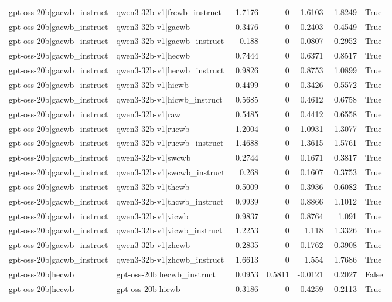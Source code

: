 \begin{table}
\begin{tabular}{l l r r r r l}
gpt-oss-20b|gacwb_instruct & qwen3-32b-v1|frcwb_instruct & 1.7176 & 0 & 1.6103 & 1.8249 & True \\
gpt-oss-20b|gacwb_instruct & qwen3-32b-v1|gacwb & 0.3476 & 0 & 0.2403 & 0.4549 & True \\
gpt-oss-20b|gacwb_instruct & qwen3-32b-v1|gacwb_instruct & 0.188 & 0 & 0.0807 & 0.2952 & True \\
gpt-oss-20b|gacwb_instruct & qwen3-32b-v1|hecwb & 0.7444 & 0 & 0.6371 & 0.8517 & True \\
gpt-oss-20b|gacwb_instruct & qwen3-32b-v1|hecwb_instruct & 0.9826 & 0 & 0.8753 & 1.0899 & True \\
gpt-oss-20b|gacwb_instruct & qwen3-32b-v1|hicwb & 0.4499 & 0 & 0.3426 & 0.5572 & True \\
gpt-oss-20b|gacwb_instruct & qwen3-32b-v1|hicwb_instruct & 0.5685 & 0 & 0.4612 & 0.6758 & True \\
gpt-oss-20b|gacwb_instruct & qwen3-32b-v1|raw & 0.5485 & 0 & 0.4412 & 0.6558 & True \\
gpt-oss-20b|gacwb_instruct & qwen3-32b-v1|rucwb & 1.2004 & 0 & 1.0931 & 1.3077 & True \\
gpt-oss-20b|gacwb_instruct & qwen3-32b-v1|rucwb_instruct & 1.4688 & 0 & 1.3615 & 1.5761 & True \\
gpt-oss-20b|gacwb_instruct & qwen3-32b-v1|swcwb & 0.2744 & 0 & 0.1671 & 0.3817 & True \\
gpt-oss-20b|gacwb_instruct & qwen3-32b-v1|swcwb_instruct & 0.268 & 0 & 0.1607 & 0.3753 & True \\
gpt-oss-20b|gacwb_instruct & qwen3-32b-v1|thcwb & 0.5009 & 0 & 0.3936 & 0.6082 & True \\
gpt-oss-20b|gacwb_instruct & qwen3-32b-v1|thcwb_instruct & 0.9939 & 0 & 0.8866 & 1.1012 & True \\
gpt-oss-20b|gacwb_instruct & qwen3-32b-v1|vicwb & 0.9837 & 0 & 0.8764 & 1.091 & True \\
gpt-oss-20b|gacwb_instruct & qwen3-32b-v1|vicwb_instruct & 1.2253 & 0 & 1.118 & 1.3326 & True \\
gpt-oss-20b|gacwb_instruct & qwen3-32b-v1|zhcwb & 0.2835 & 0 & 0.1762 & 0.3908 & True \\
gpt-oss-20b|gacwb_instruct & qwen3-32b-v1|zhcwb_instruct & 1.6613 & 0 & 1.554 & 1.7686 & True \\
gpt-oss-20b|hecwb & gpt-oss-20b|hecwb_instruct & 0.0953 & 0.5811 & -0.0121 & 0.2027 & False \\
gpt-oss-20b|hecwb & gpt-oss-20b|hicwb & -0.3186 & 0 & -0.4259 & -0.2113 & True \\

\end{tabular}
\end{table}
